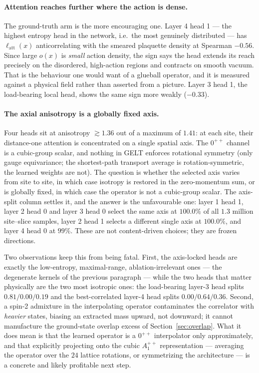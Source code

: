 \documentclass[11pt,a4paper]{article}
\begin{document}
\paragraph{Attention reaches further where the action is dense.} The
ground-truth arm is the more encouraging one. Layer 4 head 1 --- the highest
entropy head in the network, i.e.\ the most genuinely distributed --- has
$\ell_{\mathrm{att}}(x)$ anticorrelating with the smeared plaquette density at
Spearman $-0.56$. Since large $o(x)$ is \emph{small} action density, the sign
says the head extends its reach precisely on the disordered, high-action
regions and contracts on smooth vacuum. That is the behaviour one would want
of a glueball operator, and it is measured against a physical field rather
than asserted from a picture. Layer 3 head 1, the load-bearing local head,
shows the same sign more weakly ($-0.33$).

\paragraph{The axial anisotropy is a globally fixed axis.} Four heads sit at
anisotropy $\gtrsim1.36$ out of a maximum of $1.41$: at each site, their
distance-one attention is concentrated on a single spatial axis. The $0^{++}$
channel is a cubic-group scalar, and nothing in GELT enforces rotational
symmetry (only gauge equivariance; the shortest-path transport average is
rotation-symmetric, the learned weights are not). The question is whether the
selected axis varies from site to site, in which case isotropy is restored in
the zero-momentum sum, or is globally fixed, in which case the operator is not
a cubic-group scalar. The axis-split column settles it, and the answer is the
unfavourable one: layer 1 head 1, layer 2 head 0 and layer 3 head 0 select the
same axis at $100.0\%$ of all $1.3$ million site--slice samples, layer 2
head 1 selects a different single axis at $100.0\%$, and layer 4 head 0 at
$99\%$. These are not content-driven choices; they are frozen directions.

Two observations keep this from being fatal. First, the axis-locked heads are
exactly the low-entropy, maximal-range, ablation-irrelevant ones --- the
degenerate kernels of the previous paragraph --- while the two heads that
matter physically are the two most isotropic ones: the load-bearing layer-3
head splits $0.81/0.00/0.19$ and the best-correlated layer-4 head splits
$0.00/0.64/0.36$. Second, a spin-2 admixture in the interpolating operator
contaminates the correlator with \emph{heavier} states, biasing an extracted
mass upward, not downward; it cannot manufacture the ground-state overlap
excess of Section~\ref{sec:overlap}. What it does mean is that the learned
operator is a $0^{++}$ interpolator only approximately, and that explicitly
projecting onto the cubic $A_1^{++}$ representation --- averaging the operator
over the $24$ lattice rotations, or symmetrizing the architecture --- is a
concrete and likely profitable next step.
\end{document}
